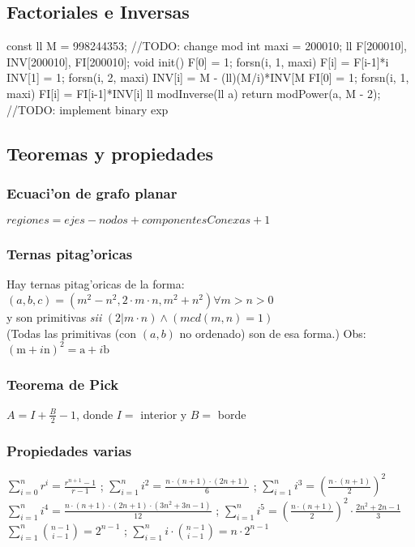 \documentclass[10pt, landscape, twocolumn, a4paper, notitlepage]{article}
\begin{document}
\subsection{Factoriales e Inversas}
\begin{code}
const ll M = 998244353; //TODO: change mod
int maxi = 200010;
ll F[200010], INV[200010], FI[200010];
void init(){
	F[0] = 1; forsn(i, 1, maxi) F[i] = F[i-1]*i %
	INV[1] = 1; forsn(i, 2, maxi) INV[i] = M - (ll)(M/i)*INV[M%
	FI[0] = 1; forsn(i, 1, maxi) FI[i] = FI[i-1]*INV[i] %
}
ll modInverse(ll a){
    return modPower(a, M - 2); //TODO: implement binary exp
}
\end{code}
\subsection{Teoremas y propiedades}%
\subsubsection{Ecuaci'on de grafo planar}
$regiones = ejes - nodos + componentesConexas + 1$
\subsubsection{Ternas pitag'oricas}
Hay ternas pitag'oricas de la forma: $(a,b,c) = ( m^2-n^2 , 2\cdot m\cdot n, m^2+n^2 ) \forall m > n > 0 $\\
y son primitivas \emph{sii} $(2 | m\cdot n) \land (mcd(m, n) = 1)$\\
(Todas las primitivas (con $(a,b)$ no ordenado) son de esa forma.) Obs: $(\mathrm{m}+i\mathrm{n})^2 = \mathrm{a}+i\mathrm{b}$
\subsubsection{Teorema de Pick}
$A = I + \frac{B}{2} - 1$, donde $I =$ interior y $B =$ borde
%
\subsubsection{Propiedades varias}
$\sum_{i=0}^n{r^i} = \frac{r^{n+1}-1}{r-1}$ ; $\sum_{i=1}^n{i^2} = \frac{n\cdot(n+1)\cdot(2n+1)}{6}$ ;
$\sum_{i=1}^n{i^3} = \left(\frac{n\cdot(n+1)}{2}\right)^2$ \\
$\sum_{i=1}^n{i^4} = \frac{n\cdot(n+1)\cdot(2n+1)\cdot(3n^2+3n-1)}{12}$ ;
$\sum_{i=1}^{ n} i^5 = \left(\frac{ n \cdot (n+1)}{2}\right) ^2 \cdot \frac{2 n ^2 + 2n - 1}{3}$ \\
%
$\sum_{i=1}^n{\binom{n-1}{i-1}} = 2^{n-1}$ ; $\sum_{i=1}^n{i\cdot\binom{n-1}{i-1}} = n\cdot2^{n-1}$ \\
%
\end{document}
